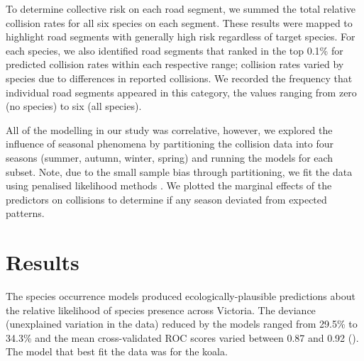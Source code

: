 To determine collective risk on each road segment, we summed the total relative collision rates for all six species on each segment.  These results were mapped to highlight road segments with generally high risk regardless of target species. For each species, we also identified road segments that ranked in the top 0.1\% for predicted collision rates within each respective range; collision rates varied by species due to differences in reported collisions. We recorded the frequency that individual road segments appeared in this category, the values ranging from zero (no species) to six (all species).

All of the modelling in our study was correlative, however, we explored the influence of seasonal phenomena by partitioning the collision data into four seasons (summer, autumn, winter, spring) and running the models for each subset. Note, due to the small sample bias through partitioning, we fit the data using penalised likelihood methods \citep[see][]{firt93}.  We plotted the marginal effects of the predictors on collisions to determine if any season deviated from expected patterns.

\section{Results}

The species occurrence models produced ecologically-plausible predictions about the relative likelihood of species presence across Victoria. The deviance (unexplained variation in the data) reduced by the models ranged from 29.5\% to 34.3\% and the mean cross-validated ROC scores varied between 0.87 and 0.92 (). The model that best fit the data was for the koala. 

